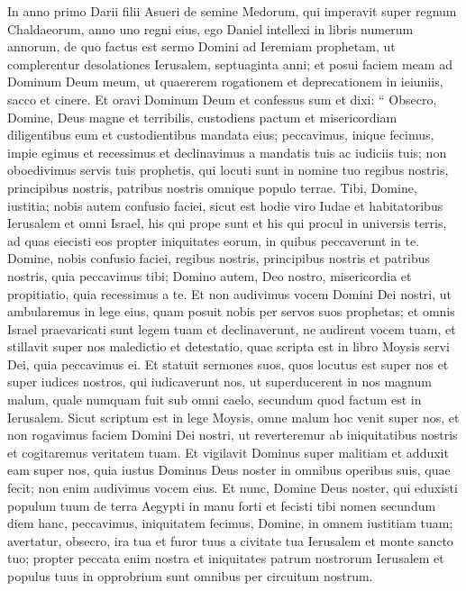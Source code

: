 \begin{biblechapter}
\begin{biblechapter}
\begin{biblechapter}
\begin{biblechapter}
\begin{biblechapter}
\begin{biblechapter}
\begin{biblechapter}
\begin{biblechapter}
\begin{biblechapter}
\verse In anno primo Darii filii Asueri de semine Medorum, qui imperavit super regnum Chaldaeorum, 
\verse anno uno regni eius, ego Daniel intellexi in libris numerum annorum, de quo factus est sermo Domini ad Ieremiam prophetam, ut complerentur desolationes Ierusalem, septuaginta anni; 
\verse et posui faciem meam ad Dominum Deum meum, ut quaererem rogationem et deprecationem in ieiuniis, sacco et cinere. 
\verse Et oravi Dominum Deum et confessus sum et dixi:
 “ Obsecro, Domine, Deus magne et terribilis, custodiens pactum et misericordiam diligentibus eum et custodientibus mandata eius; 
\verse peccavimus, inique fecimus, impie egimus et recessimus et declinavimus a mandatis tuis ac iudiciis tuis; 
\verse non oboedivimus servis tuis prophetis, qui locuti sunt in nomine tuo regibus nostris, principibus nostris, patribus nostris omnique populo terrae. 
 \verse Tibi, Domine, iustitia; nobis autem confusio faciei, sicut est hodie viro Iudae et habitatoribus Ierusalem et omni Israel, his qui prope sunt et his qui procul in universis terris, ad quas eiecisti eos propter iniquitates eorum, in quibus peccaverunt in te. 
\verse Domine, nobis confusio faciei, regibus nostris, principibus nostris et patribus nostris, quia peccavimus tibi; 
\verse Domino autem, Deo nostro, misericordia et propitiatio, quia recessimus a te. 
\verse Et non audivimus vocem Domini Dei nostri, ut ambularemus in lege eius, quam posuit nobis per servos suos prophetas; 
\verse et omnis Israel praevaricati sunt legem tuam et declinaverunt, ne audirent vocem tuam, et stillavit super nos maledictio et detestatio, quae scripta est in libro Moysis servi Dei, quia peccavimus ei. 
 \verse Et statuit sermones suos, quos locutus est super nos et super iudices nostros, qui iudicaverunt nos, ut superducerent in nos magnum malum, quale numquam fuit sub omni caelo, secundum quod factum est in Ierusalem. 
\verse Sicut scriptum est in lege Moysis, omne malum hoc venit super nos, et non rogavimus faciem Domini Dei nostri, ut reverteremur ab iniquitatibus nostris et cogitaremus veritatem tuam. 
\verse Et vigilavit Dominus super malitiam et adduxit eam super nos, quia iustus Dominus Deus noster in omnibus operibus suis, quae fecit; non enim audivimus vocem eius. 
\verse Et nunc, Domine Deus noster, qui eduxisti populum tuum de terra Aegypti in manu forti et fecisti tibi nomen secundum diem hanc, peccavimus, iniquitatem fecimus, 
\verse Domine, in omnem iustitiam tuam; avertatur, obsecro, ira tua et furor tuus a civitate tua Ierusalem et monte sancto tuo; propter peccata enim nostra et iniquitates patrum nostrorum Ierusalem et populus tuus in opprobrium sunt omnibus per circuitum nostrum. 

\end{biblechapter}
\end{biblechapter}
\end{biblechapter}
\end{biblechapter}
\end{biblechapter}
\end{biblechapter}
\end{biblechapter}
\end{biblechapter}
\end{biblechapter}
